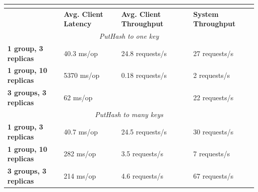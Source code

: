 \documentclass[letterpaper,10pt]{article}
\begin{document}
\begin{table}
\begin{tabular}{|l|l|l|l|}
\hline
\multicolumn{4}{|c|}{\cellcolor[HTML]{C0C0C0}{\color[HTML]{000000} \textbf{Vanilla Paxos}}}                           \\ \hline
                              & \textbf{Avg. Client Latency} & \textbf{Avg. Client Throughput} & \textbf{System Throughput} \\ \hline
\multicolumn{4}{|c|}{\textit{PutHash to one key}}                                                                     \\ \hline
\textbf{1 group, 3 replicas}  & 40.3 ms/op                   & 24.8 requests/s              & 27 requests/s           \\ \hline
\textbf{1 group, 10 replicas} & 5370 ms/op                   & 0.18 requests/s              & 2 requests/s            \\ \hline
\textbf{3 groups, 3 replicas} & 62 ms/op                     &                              & 22 requests/s           \\ \hline
\multicolumn{4}{|c|}{\textit{PutHash to many keys}}                                                                   \\ \hline
\textbf{1 group, 3 replicas}  & 40.7 ms/op                   & 24.5 requests/s              & 30 requests/s           \\ \hline
\textbf{1 group, 10 replicas} & 282 ms/op                    & 3.5 requests/s               & 7 requests/s            \\ \hline
\textbf{3 groups, 3 replicas} & 214 ms/op                    & 4.6 requests/s               & 67 requests/s           \\ \hline
\end{tabular}
\end{table}
\end{document}
